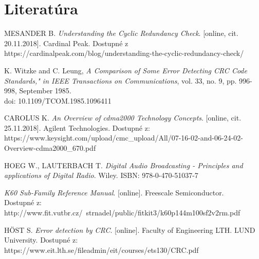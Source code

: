 \documentclass[11pt,a4paper]{article}
\begin{document}
\newpage
\section{Literatúra}

\begin{enumerate}[label={[\arabic*]}]
  \item MESANDER B. \textit{Understanding the Cyclic Redundancy Check}. [online, cit. 20.11.2018]. Cardinal Peak. Dostupné z https://cardinalpeak.com/blog/understanding-the-cyclic-redundancy-check/
  \item K. Witzke and C. Leung, \textit{A Comparison of Some Error Detecting CRC Code Standards," in IEEE Transactions on Communications}, vol. 33, no. 9, pp. 996-998, September 1985.\\ doi: 10.1109/TCOM.1985.1096411
  \item CAROLUS K. \textit{An Overview of cdma2000 Technology Concepts}. [online, cit. 25.11.2018]. Agilent Technologies. Dostupné z: https://www.keysight.com/upload/cmc\_upload/All/07-16-02-and-06-24-02-Overview-cdma2000\_670.pdf
  \item HOEG W., LAUTERBACH T. \textit{Digital Audio Broadcasting - Principles and applications of Digital Radio}. Wiley. ISBN: 978-0-470-51037-7
  \item \textit{K60 Sub-Family Reference Manual}. [online]. Freescale Semiconductor.\\ Dostupné z: http://www.fit.vutbr.cz/~strnadel/public/fitkit3/k60p144m100sf2v2rm.pdf
  \item HÖST S. \textit{Error detection by CRC}. [online]. Faculty of Engineering LTH. LUND University. Dostupné z: https://www.eit.lth.se/fileadmin/eit/courses/ets130/CRC.pdf 

\end{enumerate}
\end{document}
